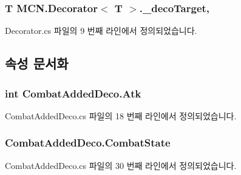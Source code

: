 \subsubsection[{\texorpdfstring{\+\_\+deco\+Target}{_decoTarget}}]{\setlength{\rightskip}{0pt plus 5cm}T {\bf M\+C\+N.\+Decorator}$<$ T $>$.\+\_\+deco\+Target\hspace{0.3cm}{\ttfamily [protected]}, {\ttfamily [inherited]}}\hypertarget{class_m_c_n_1_1_decorator_a358dba6e4ac8d5ef06ed9f5592f8827e}{}\label{class_m_c_n_1_1_decorator_a358dba6e4ac8d5ef06ed9f5592f8827e}


Decorator.\+cs 파일의 9 번째 라인에서 정의되었습니다.



\subsection{속성 문서화}
\subsubsection[{\texorpdfstring{Atk}{Atk}}]{\setlength{\rightskip}{0pt plus 5cm}int Combat\+Added\+Deco.\+Atk\hspace{0.3cm}{\ttfamily [get]}}\hypertarget{class_combat_added_deco_aeb5992435525404a992ee9f028a2cf0d}{}\label{class_combat_added_deco_aeb5992435525404a992ee9f028a2cf0d}


Combat\+Added\+Deco.\+cs 파일의 18 번째 라인에서 정의되었습니다.

\subsubsection[{\texorpdfstring{Combat\+State}{CombatState}}]{ Combat\+Added\+Deco.\+Combat\+State\hspace{0.3cm}{\ttfamily [get]}}\hypertarget{class_combat_added_deco_a16e7a3ae7dc8751d25ef0b6ee0ce5531}{}\label{class_combat_added_deco_a16e7a3ae7dc8751d25ef0b6ee0ce5531}


Combat\+Added\+Deco.\+cs 파일의 30 번째 라인에서 정의되었습니다.

